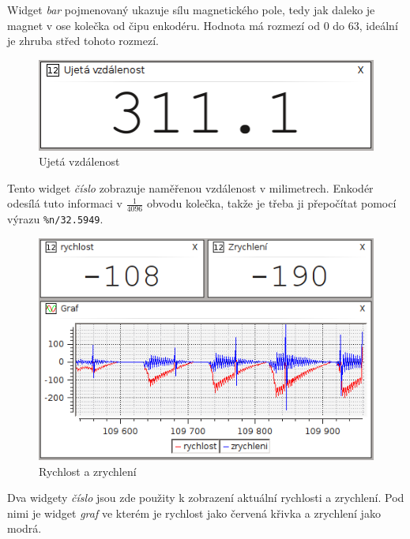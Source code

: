 \documentclass[12pt, a4paper, oneside]{article}
\newcommand{\It}{\textit}  %
\begin{document}
Widget \It{bar} pojmenovaný  ukazuje sílu magnetického pole, tedy jak daleko je magnet v ose kolečka od čipu enkodéru. Hodnota má rozmezí od 0 do 63, ideální je zhruba střed tohoto rozmezí.

\begin{figure}[H]
\begin{center}
\includegraphics[scale=0.85]{img/enc_dist.png}
\caption{Ujetá vzdálenost}
\end{center}
\end{figure}
Tento widget \It{číslo} zobrazuje naměřenou vzdálenost v milimetrech. Enkodér odesílá tuto informaci v $\frac{1}{4096}$ obvodu kolečka, takže je třeba ji přepočítat pomocí výrazu \verb|%n/32.5949|.

\begin{figure}[H]
\begin{center}
\includegraphics[width=\textwidth-60pt]{img/enc_spd.png}
\caption{Rychlost a zrychlení}
\end{center}
\end{figure}
Dva widgety \It{číslo} jsou zde použity k zobrazení aktuální rychlosti a zrychlení. Pod nimi je widget \It{graf} ve kterém je rychlost jako červená křivka a zrychlení jako modrá.
\end{document}
